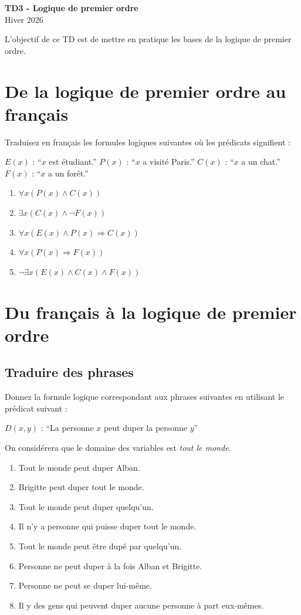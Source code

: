 \documentclass[a4paper,11pt]{article}
\begin{document}
\begin{center}
{\Huge\bfseries TD3 - Logique de premier ordre} \\[0.5cm]
{\large Hiver 2026} \\[0.3cm]
\end{center}

\vspace{0.5cm}

L'objectif de ce TD est de mettre en pratique les bases de la logique de premier ordre.

\section{De la logique de premier ordre au français}

Traduisez en français les formules logiques suivantes où les prédicats signifient :

$E(x)$ : ``$x$ est étudiant.'' \quad $P(x)$ : ``$x$ a visité Paris.'' \quad $C(x)$ : ``$x$ a un chat.'' \quad $F(x)$ : ``$x$ a un forêt.''

\begin{enumerate}
\item $\forall x(P(x) \wedge C(x))$
\item $\exists x(C(x) \wedge \neg F(x))$
\item $\forall x(E(x) \wedge P(x) \Rightarrow C(x))$
\item $\forall x(P(x) \Rightarrow F(x))$
\item $\neg \exists x(E(x) \wedge C(x) \wedge F(x))$
\end{enumerate}

\section{Du français à la logique de premier ordre}

\subsection{Traduire des phrases}

Donnez la formule logique correspondant aux phrases suivantes en utilisant le prédicat suivant :

$D(x,y)$ : ``La personne $x$ peut duper la personne $y$''

On considérera que le domaine des variables est \emph{tout le monde}.

\begin{enumerate}
\item Tout le monde peut duper Alban.
\item Brigitte peut duper tout le monde.
\item Tout le monde peut duper quelqu'un.
\item Il n'y a personne qui puisse duper tout le monde.
\item Tout le monde peut être dupé par quelqu'un.
\item Personne ne peut duper à la fois Alban et Brigitte.
\item Personne ne peut se duper lui-même.
\item Il y des gens qui peuvent duper aucune personne à part eux-mêmes.
\end{enumerate}
\end{document}
